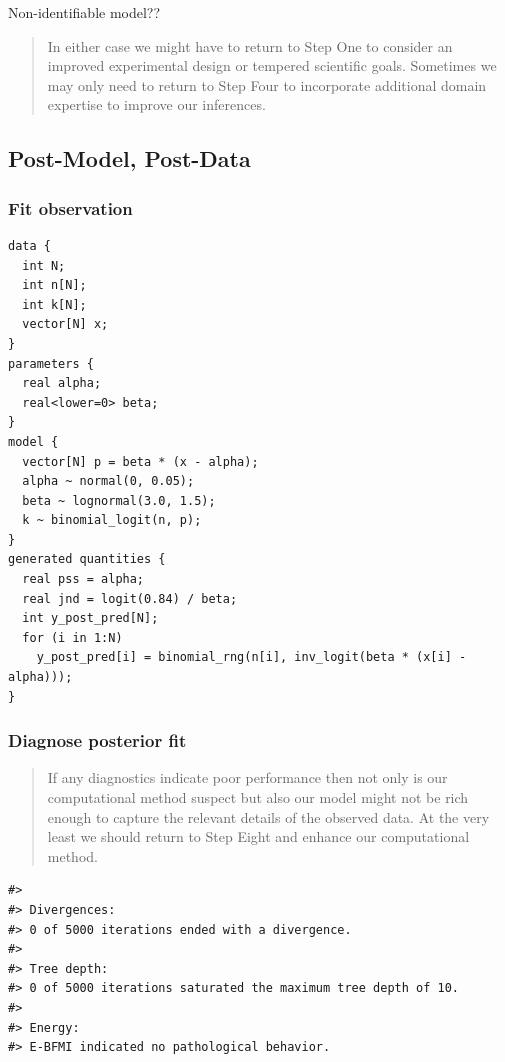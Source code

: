 \documentclass[11pt, oneside, openany]{scrbook}
\begin{document}
Non-identifiable model??

\begin{quote}
In either case we might have to return to Step One to consider an improved experimental design or tempered scientific goals. Sometimes we may only need to return to Step Four to incorporate additional domain expertise to improve our inferences.
\end{quote}

\hypertarget{post-model-post-data}{%
\subsection{Post-Model, Post-Data}\label{post-model-post-data}}

\hypertarget{fit-observation}{%
\subsubsection{Fit observation}\label{fit-observation}}


\begin{verbatim}
data {
  int N;
  int n[N];
  int k[N];
  vector[N] x;
}
parameters {
  real alpha;
  real<lower=0> beta;
}
model {
  vector[N] p = beta * (x - alpha);
  alpha ~ normal(0, 0.05);
  beta ~ lognormal(3.0, 1.5);
  k ~ binomial_logit(n, p);
}
generated quantities {
  real pss = alpha;
  real jnd = logit(0.84) / beta;
  int y_post_pred[N];
  for (i in 1:N)
    y_post_pred[i] = binomial_rng(n[i], inv_logit(beta * (x[i] - alpha)));
}
\end{verbatim}


\hypertarget{diagnose-posterior-fit}{%
\subsubsection{Diagnose posterior fit}\label{diagnose-posterior-fit}}

\begin{quote}
If any diagnostics indicate poor performance then not only is our computational method suspect but also our model might not be rich enough to capture the relevant details of the observed data. At the very least we should return to Step Eight and enhance our computational method.
\end{quote}


\begin{verbatim}
#> 
#> Divergences:
#> 0 of 5000 iterations ended with a divergence.
#> 
#> Tree depth:
#> 0 of 5000 iterations saturated the maximum tree depth of 10.
#> 
#> Energy:
#> E-BFMI indicated no pathological behavior.
\end{verbatim}
\end{document}
